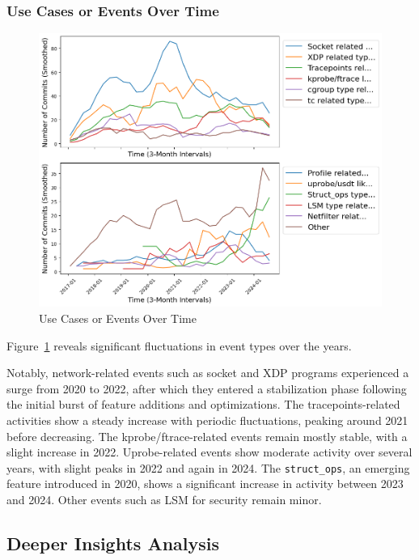 \subsubsection{Use Cases or Events Over Time}

\begin{figure}[ht]
    \centering
    \includegraphics[width=\linewidth]{feature-analysis/timeline_usecases_or_submodule_events_smoothed.png}
    \caption{Use Cases or Events Over Time}
    \label{fig:timeline_usecases_or_submodule_events_smoothed}
\end{figure}

Figure~\ref{fig:timeline_usecases_or_submodule_events_smoothed} reveals significant fluctuations in event types over the years.

Notably, network-related events such as socket and XDP programs experienced a surge from 2020 to 2022, after which they entered a stabilization phase following the initial burst of feature additions and optimizations. The tracepoints-related activities show a steady increase with periodic fluctuations, peaking around 2021 before decreasing. The kprobe/ftrace-related events remain mostly stable, with a slight increase in 2022. Uprobe-related events show moderate activity over several years, with slight peaks in 2022 and again in 2024. The \texttt{struct\_ops}, an emerging feature introduced in 2020, shows a significant increase in activity between 2023 and 2024. Other events such as LSM for security remain minor.

\subsection{Deeper Insights Analysis}

